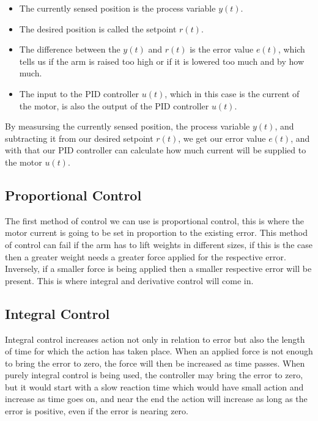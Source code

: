 \documentclass[10pt,conference]{IEEEtran}
\begin{document}
\begin{itemize}
    \item The currently sensed position is the process variable \(y(t)\).
    \item The desired position is called the setpoint \(r(t)\).
    \item The difference between the \(y(t)\) and \(r(t)\) is the error value \(e(t)\), which
          tells us if the arm is raised too high or if it is lowered too much and by how much.
    \item The input to the PID controller \(u(t)\), which in this case is the current of the motor, is
          also the output of the PID controller \(u(t)\).
\end{itemize}

By measursing the currently sensed position, the process variable \(y(t)\), and subtracting it from
our desired setpoint \(r(t)\), we get our error value \(e(t)\), and with that our PID controller
can calculate how much current will be supplied to the motor \(u(t)\).

\subsection{Proportional Control}

The first method of control we can use is proportional control, this is where the motor current
is going to be set in proportion to the existing error. This method of control can fail if the
arm has to lift weights in different sizes, if this is the case then a greater weight needs a
greater force applied for the respective error. Inversely, if a smaller force is being applied
then a smaller respective error will be present. This is where integral and derivative control
will come in.

\subsection{Integral Control}

Integral control increases action not only in relation to error but also the length of time 
for which the action has taken place. When an applied force is not enough to bring the error 
to zero, the force will then be increased as time passes. When purely integral control is 
being used, the controller may bring the error to zero, but it would start with a slow 
reaction time which would have small action and increase as time goes on, and near the 
end the action will increase as long as the error is positive, even if the error is 
nearing zero.
\end{document}
